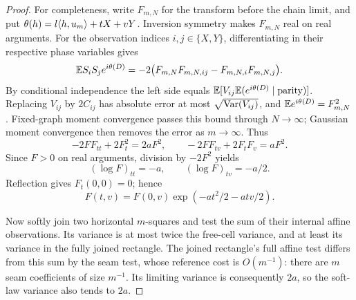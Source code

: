 \begin{proof}
For completeness, write \(F_{m,N}\) for the transform before the
chain limit, and put
\(\theta(h)=l\langle h,u_m\rangle+tX+vY\).
Inversion symmetry makes \(F_{m,N}\) real on real arguments.
For the observation indices \(i,j\in\{X,Y\}\), differentiating
in their respective phase variables gives
\[
 \mathbb E S_iS_j e^{i\theta(D)}
 =-2\bigl(F_{m,N}F_{m,N,ij}
                     -F_{m,N,i}F_{m,N,j}\bigr).
\]
By conditional independence the left side equals
\(\mathbb E[V_{ij}\mathbb E(e^{i\theta(D)}\mid\text{parity})]\).
Replacing \(V_{ij}\) by \(2C_{ij}\) has absolute error at most
\(\sqrt{\operatorname{Var}(V_{ij})}\), and
\(\mathbb E e^{i\theta(D)}=F_{m,N}^2\).
Fixed-graph moment convergence passes this bound through
\(N\to\infty\); Gaussian moment convergence then removes the
error as \(m\to\infty\). Thus
\[
 -2FF_{tt}+2F_t^2=2aF^2,\qquad
 -2FF_{tv}+2F_tF_v=aF^2.
\]
Since \(F>0\) on real arguments, division by \(-2F^2\) yields
\[
 (\log F)_{tt}=-a,\qquad(\log F)_{tv}=-a/2.
\]
Reflection gives \(F_t(0,0)=0\); hence
\begin{equation}
 F(t,v)=F(0,v)\exp(-at^2/2-atv/2).
 \label{eq:phase-transform}
\end{equation}

Now softly join two horizontal \(m\)-squares and test the sum
of their internal affine observations. Its variance is at most
twice the free-cell variance, and at least its variance in the
fully joined rectangle. The joined rectangle's full affine
test differs from this sum by the seam test, whose reference
cost is \(O(m^{-1})\): there are \(m\) seam coefficients of
size \(m^{-1}\). Its limiting variance is consequently \(2a\),
so the soft-law variance also tends to \(2a\).


\end{proof}
